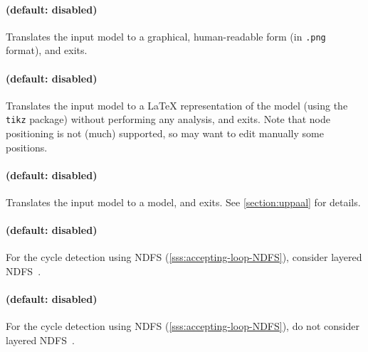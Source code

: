 \paragraph{ (default: disabled)}
Translates the input model to a graphical, human-readable form (in \texttt{.png} format), and exits.

\paragraph{ (default: disabled)}
Translates the input model to a \LaTeX{} representation of the model (using the \texttt{tikz} package) without performing any analysis, and exits.
Note that node positioning is not (much) supported, so may want to edit manually some positions.

\paragraph{ (default: disabled)}
Translates the input model to a \uppaal{} model, and exits.
See \cref{section:uppaal} for details.



\paragraph{ (default: disabled)}
For the cycle detection using NDFS (\cref{sss:accepting-loop-NDFS}), consider layered NDFS~\cite{NPP18}.

\paragraph{ (default: disabled)}
For the cycle detection using NDFS (\cref{sss:accepting-loop-NDFS}), do not consider layered NDFS~\cite{NPP18}.


